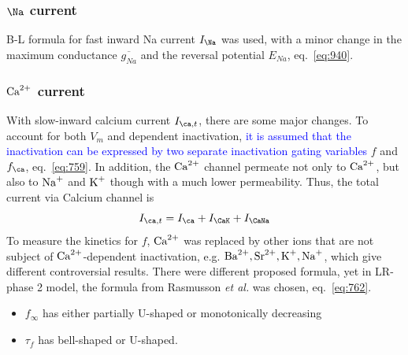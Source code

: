 
\subsubsection{$\Na$ current}

B-L formula for fast inward Na current $I_\Na$ was used, with a
minor change in the maximum conductance $\overline{g_{Na}}$ and the
reversal potential $E_{Na}$, eq.~\eqref{eq:940}.

\subsubsection{${\text{Ca}^{2+}}$ current}

With slow-inward calcium current $I_{\ca,t}$, there are some major
changes. To account for both $V_m$ and  dependent
inactivation,
\textcolor{blue}{it is assumed that the inactivation can be expressed
  by two separate inactivation gating variables} $f$ and $f_\ca $,
eq.~\eqref{eq:759}. In addition, the ${\text{Ca}^{2+}}$ channel permeate not
only to ${\text{Ca}^{2+}}$, but also to $\ce{Na+}$ and $\ce{K+}$ though with a
much lower permeability. Thus, the total current via Calcium channel
is
  \begin{equation}
    \label{eq:761}
    I_{\ca,t} = I_\ca +I_\CaK+I_\CaNa
  \end{equation}
  To measure the kinetics for $f$, ${\text{Ca}^{2+}}$ was replaced by other
  ions that are not subject of ${\text{Ca}^{2+}}$-dependent inactivation,
  e.g. $\ce{Ba^2+}, \ce{Sr^2+}, \ce{K+}, \ce{Na+}$, which give different
  controversial results. There were different proposed formula, yet in LR-phase
  2 model, the formula from Rasmusson {\it et al.} was chosen, eq.~\eqref{eq:762}.
  
\begin{itemize}
\item $f_\infty$ has either partially U-shaped or monotonically
  decreasing
\item $\tau_f$ has bell-shaped or U-shaped. 
\end{itemize}

